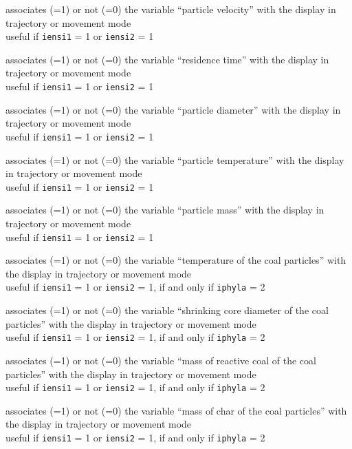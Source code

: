 {associates (=1) or not (=0) the variable ``particle velocity''
with the display in trajectory or movement mode\\
useful if \texttt{iensi1} = 1 or \texttt{iensi2} = 1}

{associates (=1) or not (=0) the variable ``residence time''
with the display in trajectory or movement mode\\
useful if \texttt{iensi1} = 1 or \texttt{iensi2} = 1}

{associates (=1) or not (=0) the variable ``particle diameter''
with the display in trajectory or movement mode\\
useful if \texttt{iensi1} = 1 or \texttt{iensi2} = 1}

{associates (=1) or not (=0) the variable ``particle temperature''
with the display in trajectory or movement mode\\
useful if \texttt{iensi1} = 1 or \texttt{iensi2} = 1}

{associates (=1) or not (=0) the variable ``particle mass''
with the display in trajectory or movement mode\\
useful if \texttt{iensi1} = 1 or \texttt{iensi2} = 1}

{associates (=1) or not (=0) the variable ``temperature of the coal particles''
with the display in trajectory or movement mode\\
useful if \texttt{iensi1} = 1 or \texttt{iensi2} = 1, if and only
if \texttt{iphyla} = 2}

{associates (=1) or not (=0) the variable ``shrinking core diameter of
the coal particles'' with the display in trajectory or movement mode\\
useful if \texttt{iensi1} = 1 or \texttt{iensi2} = 1, if and only if
\texttt{iphyla} = 2}

{associates (=1) or not (=0) the variable ``mass of reactive coal of the
coal particles'' with the display in trajectory or movement mode\\
useful if \texttt{iensi1} = 1 or \texttt{iensi2} = 1, if and only if
\texttt{iphyla} = 2}

{associates (=1) or not (=0) the variable ``mass of char of the
coal particles'' with the display in trajectory or movement mode\\
useful if \texttt{iensi1} = 1 or \texttt{iensi2} = 1, if and only if
\texttt{iphyla} = 2}

